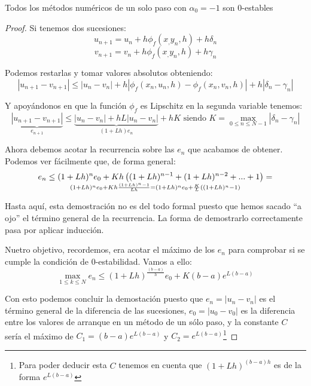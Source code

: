 \documentclass{apuntes}
\begin{document}
\begin{prop}
Todos los métodos numéricos de un solo paso con $α_0=-1$ son 0-estables
\end{prop}
\begin{proof}
Si tenemos dos sucesiones:
\[u_{n+1}=u_n+h\phi_f(x_,y_n,h)+hδ_n\]
\[v_{n+1}=v_n+h\phi_f(x_,y_n,h)+hγ_n\]

Podemos restarlas y tomar valores absolutos obteniendo:
\[|u_{n+1}-v_{n+1}|\leq |u_n-v_n| + h |\phi_f(x_n,u_n,h)-\phi_f(x_n,v_n,h)|+h|δ_n-γ_n|\]

Y apoyándonos en que la función $\phi_f$ es Lipschitz en la segunda variable tenemos:
\[\underbrace{|u_{n+1}-v_{n+1}|}_{e_{n+1}}\leq \underbrace{|u_n-v_n| + hL|u_n-v_n|}_{(1+Lh)e_n}+hK \text{ siendo } K=\max_{0 \leq n \leq N-1}|δ_n-γ_n|\]

Ahora debemos acotar la recurrencia sobre las $e_n$ que acabamos de obtener. Podemos ver fácilmente que, de forma general:
\[e_n \leq (1+Lh)^ne_0+Kh\left( (1+Lh)^{n-1}+(1+Lh)^{n-2}+...+1\right)=\atop (1+Lh)^ne_0+Kh\frac{(1+Lh)^n-1}{Lh}=(1+Lh)^ne_0+\frac{K}{L}((1+Lh)^n-1)\]

\obs Hasta aquí, esta demostración no es del todo formal puesto que hemos sacado ``a ojo'' el término general de la recurrencia. La forma de demostrarlo correctamente pasa por aplicar inducción.

Nuetro objetivo, recordemos, era acotar el máximo de los $e_n$ para comprobar si se cumple la condición de 0-estabilidad. Vamos a ello:
\[\max_{1\leq k \leq N}e_n \leq (1+Lh)^{\frac{(b-a)}{h}}e_0 + K(b-a)e^{L(b-a)}\]

Con esto podemos concluir la demostación puesto que $e_n=|u_n-v_n|$ es el término general de la diferencia de las sucesiones, $e_0=|u_0-v_0|$ es la diferencia entre los valores de arranque en un método de un sólo paso, y la constante $C$ sería el máximo de $C_1=(b-a)e^{L(b-a)}$ y $C_2=e^{L(b-a)}$\footnote{Para poder deducir esta $C$ tenemos en cuenta que $(1+Lh)^{(b-a)h}$ es de la forma $e^{L(b-a)}$}
\end{proof}
\end{document}
